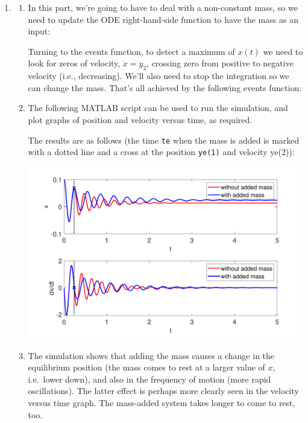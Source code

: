 \documentclass[a4paper,11pt]{article}
\newcommand{\matlab}[1]{\texttt{#1}}
\begin{document}
\begin{enumerate}
\begin{enumerate}
\end{enumerate}

\item
\begin{enumerate}

  \item In this part, we're going to have to deal with a non-constant mass, so we need to update the ODE right-hand-side function to have the mass as an input: 
    

    Turning to the events function, to detect a maximum of $x(t)$ we need to look for zeros of velocity, $\dot{x}=y_2$, crossing zero from positive to negative velocity (i.e., decreasing). We'll also need to stop the integration so we can change the mass. That's all achieved by the following events function:
    
    
  \item The following MATLAB script can be used to run the simulation, and plot graphs of
    position and velocity versus time, as required.
    
    
    The results are as follows (the time \matlab{te} when the mass is added is marked with a dotted line and a cross at the position \matlab{ye(1)} and velocity {ye(2)}):
    \begin{center}
      \includegraphics[width=0.9\linewidth]{images/Q2b}
    \end{center}

  \item The simulation shows that adding the mass causes a change in the equilibrium position (the
    mass comes to rest at a larger value of $x$, i.e.\ lower down), and also in the frequency of
    motion (more rapid oscillations). The latter effect is perhaps more clearly seen in the
    velocity versus time graph. The mass-added system takes longer to come to rest, too.
\end{enumerate}

\end{enumerate}
\end{document}
